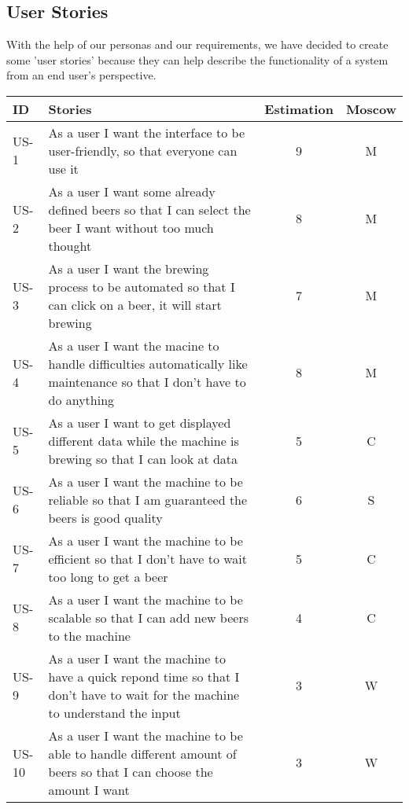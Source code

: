 \subsection{User Stories}

With the help of our personas and our requirements, we have decided to create some 'user stories' because they can help 
describe the functionality of a system from an end user's perspective.

\begin{table}[H]
    \begin{center}
        \sloppy
        \begin{longtable}{|p{1cm}|p{11cm}|c|c|}
            \hline
            ID    & Stories                                                                                                                       & Estimation & Moscow \\ \hline
            US-1  & As a user I want the interface to be user-friendly, so that everyone can use it                                               & 9          & M      \\ \hline
            US-2  & As a user I want some already defined beers so that I can select the beer I want without too much thought                     & 8          & M      \\ \hline
            US-3  & As a user I want the brewing process to be automated so that I can click on a beer, it will start brewing                     & 7          & M      \\ \hline
            US-4  & As a user I want the macine to handle difficulties automatically like maintenance so that I don't have to do anything         & 8          & M      \\ \hline
            US-5  & As a user I want to get displayed different data while the machine is brewing so that I can look at data                      & 5          & C      \\ \hline
            US-6  & As a user I want the machine to be reliable so that I am guaranteed the beers is good quality                                 & 6          & S      \\ \hline
            US-7  & As a user I want the machine to be efficient so that I don't have to wait too long to get a beer                              & 5          & C      \\ \hline
            US-8  & As a user I want the machine to be scalable so that I can add new beers to the machine                                        & 4          & C      \\ \hline
            US-9  & As a user I want the machine to have a quick repond time so that I don't have to wait for the machine to understand the input & 3          & W      \\ \hline
            US-10 & As a user I want the machine to be able to handle different amount of beers so that I can choose the amount I want            & 3          & W      \\ \hline


\end{longtable}
\end{center}
\end{table}
